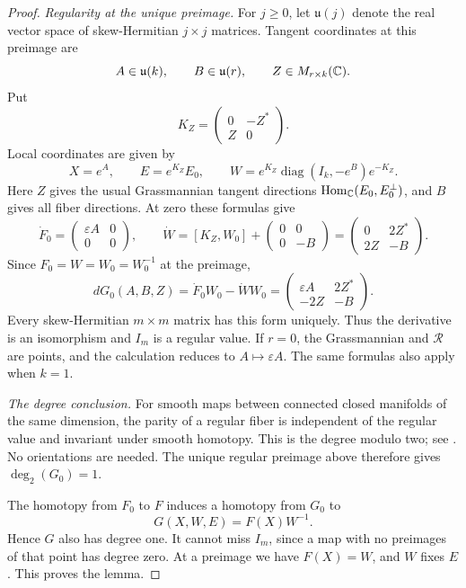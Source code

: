 \begin{proof}
\medskip\noindent
\emph{Regularity at the unique preimage.}
For $j\geq0$, let $\mathfrak u(j)$ denote the real vector space of
skew-Hermitian $j\times j$ matrices.  Tangent coordinates at this
preimage are
\[
 A\in\mathfrak u(k),\qquad B\in\mathfrak u(r),\qquad
 Z\in M_{r\times k}(\mathbb C).
\]
Put
\[
 K_Z=\begin{pmatrix}0&-Z^*\\Z&0\end{pmatrix}.
\]
Local coordinates are given by
\[
 X=e^A,\qquad E=e^{K_Z}E_0,\qquad
 W=e^{K_Z}\operatorname{diag}(I_k,-e^B)e^{-K_Z}.
\]
Here $Z$ gives the usual Grassmannian tangent directions
$\operatorname{Hom}_{\mathbb C}(E_0,E_0^\perp)$, and $B$ gives all fiber
directions.  At zero these formulas give
\[
 \dot F_0=\begin{pmatrix}\varepsilon A&0\\0&0\end{pmatrix},
 \qquad
 \dot W=[K_Z,W_0]+\begin{pmatrix}0&0\\0&-B\end{pmatrix}
       =\begin{pmatrix}0&2Z^*\\2Z&-B\end{pmatrix}.
\]
Since $F_0=W=W_0=W_0^{-1}$ at the preimage,
\begin{equation}\label{eq:degree-derivative}
 dG_0(A,B,Z)=\dot F_0W_0-\dot WW_0
   =\begin{pmatrix}\varepsilon A&2Z^*\\-2Z&-B\end{pmatrix}.
\end{equation}
Every skew-Hermitian $m\times m$ matrix has this form uniquely.
Thus the derivative is an isomorphism and $I_m$ is a regular value.
If $r=0$, the Grassmannian and $\mathcal R$ are points, and the
calculation reduces to $A\mapsto\varepsilon A$.  The same formulas
also apply when $k=1$.

\medskip\noindent
\emph{The degree conclusion.}
For smooth maps between connected closed manifolds of the same dimension,
the parity of a regular fiber is independent of the regular value and
invariant under smooth homotopy. This is the degree modulo two;
see \cite[Section 4, pp.\ 20--25]{Milnor1965}. No orientations are needed.
The unique regular preimage above therefore gives $\deg_2(G_0)=1$.

The homotopy from $F_0$ to $F$ induces a homotopy from $G_0$ to
\[
 G(X,W,E)=F(X)W^{-1}.
\]
Hence $G$ also has degree one.  It cannot miss $I_m$, since a map
with no preimages of that point has degree zero.  At a preimage
we have $F(X)=W$, and $W$ fixes $E$.  This proves the lemma.
\end{proof}
